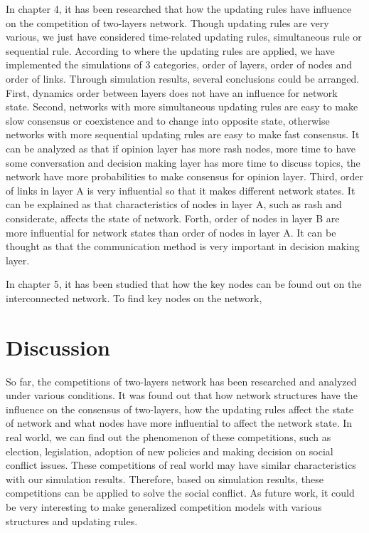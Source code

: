 In chapter 4, it has been researched that how the updating rules have influence on the competition of two-layers network. Though updating rules are very various, we just have considered time-related updating rules, simultaneous rule or sequential rule. According to where the updating rules are applied, we have implemented the simulations of 3 categories, order of layers, order of nodes and order of links. Through simulation results, several conclusions could be arranged.
First, dynamics order between layers does not have an influence for network state. Second, networks with more simultaneous updating rules are easy to make slow consensus or coexistence and to change into opposite state, otherwise networks with more sequential updating rules are easy to make fast consensus. It can be analyzed as that if opinion layer has more rash nodes, more time to have some conversation and decision making layer has more time to  discuss topics, the network have more probabilities to make consensus for opinion layer. Third, order of links in layer A is very influential so that it makes different network states. It can be explained as that characteristics of nodes in layer A, such as rash and considerate, affects the state of network. Forth, order of nodes in layer B are more influential for network states than order of nodes in layer A. It can be thought as that the communication method is very important in decision making layer. 


In chapter 5, it has been studied that how the key nodes can be found out on the interconnected network. To find key nodes on the network, 

\section{Discussion} 
So far, the competitions of two-layers network has been researched and analyzed  under various conditions. It was found out that how network structures have the influence on the consensus of two-layers, how the updating rules affect the state of network and what nodes have more influential to affect the network state. In real world, we can find out the phenomenon of these competitions, such as election, legislation, adoption of new policies and making decision on social conflict issues. These competitions of real world may have similar characteristics with our simulation results. Therefore, based on simulation results, these competitions can be applied to solve the social conflict. As future work, it could be very interesting to make generalized competition models with various structures and updating rules.   

